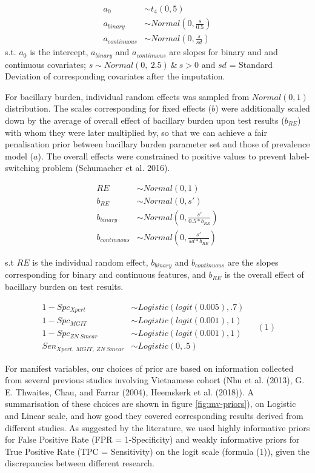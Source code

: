 \documentclass[
]{article}
\begin{document}
\[
\begin{aligned}
a_0 &\sim t_4(0, 5)\\
a_{binary} &\sim Normal(0, \frac{s}{0.5})\\
a_{continuous} &\sim Normal(0, \frac{s}{sd})
\end{aligned}
\]
s.t. \(a_0\) is the intercept, \(a_{binary}\) and \(a_{continuous}\) are slopes for binary and and continuous covariates; \(s \sim Normal(0,\ 2.5)\ \&\ s>0\) and \(sd\) = Standard Deviation of corresponding covariates after the imputation.

For bacillary burden, individual random effects was sampled from \(Normal(0,1)\) distribution. The scales corresponding for fixed effects (\(b\)) were additionally scaled down by the average of overall effect of bacillary burden upon test results (\(b_{RE}\)) with whom they were later multiplied by, so that we can achieve a fair penalisation prior between bacillary burden parameter set and those of prevalence model (\(a\)). The overall effects were constrained to positive values to prevent label-switching problem (Schumacher et al. 2016).

\[
\begin{aligned}
RE &\sim Normal(0, 1)\\
b_{RE} &\sim Normal(0, s')\\
b_{binary} &\sim Normal(0, \frac{s'}{0.5*b_{RE}})\\
b_{continuous} &\sim Normal(0, \frac{s'}{sd*b_{RE}})
\end{aligned}
\]

s.t \(RE\) is the individual random effect, \(b_{binary}\) and \(b_{continuous}\) are the slopes corresponding for binary and continuous features, and \(b_{RE}\) is the overall effect of bacillary burden on test results.

\[
\begin{aligned}
  1-Spc_{Xpert} &\sim Logistic(logit(0.005), .7) \\
  1-Spc_{MGIT}  &\sim Logistic(logit(0.001), 1) \\
  1-Spc_{ZN\ Smear} &\sim Logistic(logit(0.001), 1) \\ 
  Sen_{Xpert,\ MGIT,\ ZN\ Smear} &\sim Logistic(0,.5)
\end{aligned}
\;\;\;\;(
1
)
\]

For manifest variables, our choices of prior are based on information collected from several previous studies involving Vietnamese cohort (Nhu et al. (2013), G. E. Thwaites, Chau, and Farrar (2004), Heemskerk et al. (2018)). A summarisation of these choices are shown in figure \ref{fig:mv-priors}), on Logistic and Linear scale, and how good they covered corresponding results derived from different studies. As suggested by the literature, we used highly informative priors for False Positive Rate (FPR = 1-Specificity) and weakly informative priors for True Positive Rate (TPC = Sensitivity) on the logit scale (formula (1)), given the discrepancies between different research.
\end{document}
